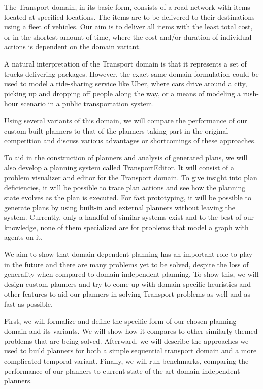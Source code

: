 The Transport domain, in its basic form, consists of a road network with items located at specified locations. The items are to be delivered to their destinations
using a fleet of vehicles. Our aim is to deliver all items
with the least total cost, or in the shortest amount of time,
where the cost and/or duration of individual actions is dependent on the domain variant.

A natural interpretation of the Transport domain is that it represents a set of trucks
delivering packages. However,
the exact same domain formulation could be used to
model a ride-sharing service like Uber, where cars drive around a city, picking up and dropping off people along the way, or
a means of modeling a rush-hour scenario in a public transportation system.

Using several variants
of this domain, we will compare the performance of our custom-built planners to that of the planners taking part in the original competition and discuss various advantages or shortcomings of these approaches.

To aid in the construction of planners and analysis of generated
plans, we will also develop a planning system called TransportEditor. It will consist of a problem visualizer and editor for the Transport domain. To give insight into plan deficiencies, it will be possible to trace plan actions and see how the planning
state evolves as the plan is executed. For fast prototyping,
it will be possible to generate plans by using built-in and external planners without leaving the system. Currently, only a handful of similar systems exist and to the best of our knowledge, none of them specialized are for problems that model a graph with agents on it.

We aim to show that domain-dependent planning has an important
role to play in the future and there are many problems yet to be solved,
despite the loss of generality when compared to domain-independent planning.
To show this, we will design custom planners
and try to come up with domain-specific heuristics and other features
to aid our planners in solving Transport problems as well and as fast as
possible.

First, we will formalize and define the specific form of our
chosen planning domain and its variants. We will show how
it compares to other similarly themed problems that are being
solved. Afterward, we will describe the approaches we used
to build planners for both a
simple sequential transport domain and a more complicated
temporal variant. Finally, we will run benchmarks,
comparing the performance of our planners to current
state-of-the-art domain-independent planners.
